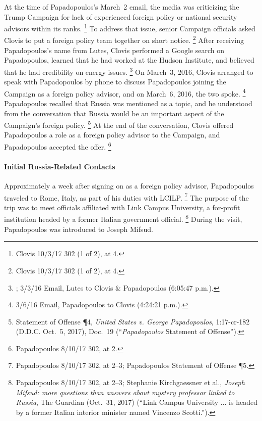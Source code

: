 At the time of Papadopoulos's March~2 email, the media was criticizing the Trump Campaign for lack of experienced foreign policy or national security advisors within its ranks.%
\footnote{Clovis 10/3/17 302 (1 of 2), at 4.}
To address that issue, senior Campaign officials asked Clovis to put a foreign policy team together on short notice.%
\footnote{Clovis 10/3/17 302 (1 of 2), at 4.}
After receiving Papadopoulos's name from Lutes, Clovis performed a Google search on Papadopoulos, learned that he had worked at the Hudson Institute, and believed that he had credibility on energy issues.%
\footnote{; 3/3/16 Email, Lutes to Clovis \& Papadopoulos (6:05:47 p.m.).}
On March~3, 2016, Clovis arranged to speak with Papadopoulos by phone to discuss Papadopoulos joining the Campaign as a foreign policy advisor, and on March~6, 2016, the two spoke.%
\footnote{3/6/16 Email, Papadopoulos to Clovis (4:24:21 p.m.).}
Papadopoulos recalled that Russia was mentioned as a topic, and he understood from the conversation that Russia would be an important aspect of the Campaign's foreign policy.%
\footnote{Statement of Offense \P 4, \textit{United States v. George Papadopoulos}, 1:17-cr-182 (D.D.C. Oct.~5,
2017), Doc.~19 (“\textit{Papadopoulos} Statement of Offense”).}
At the end of the conversation, Clovis offered Papadopoulos a role as a foreign policy advisor to the Campaign, and Papadopoulos accepted the offer.%
\footnote{Papadopoulos 8/10/17 302, at 2.}

\paragraph{Initial Russia-Related Contacts}

Approximately a week after signing on as a foreign policy advisor, Papadopoulos traveled to Rome, Italy, as part of his duties with LCILP.%
\footnote{Papadopoulos 8/10/17 302, at 2--3; Papadopoulos Statement of Offense \P 5.}
The purpose of the trip was to meet officials affiliated with Link Campus University, a for-profit institution headed by a former Italian government official.%
\footnote{Papadopoulos 8/10/17 302, at 2--3;
Stephanie Kirchgaessner et al., \textit{Joseph Mifsud: more questions than answers about mystery professor linked to Russia}, The Guardian (Oct.~31, 2017) (“Link Campus University ... is headed by a former Italian interior minister named Vincenzo Scotti.”).}
During the visit, Papadopoulos was introduced to Joseph Mifsud.

